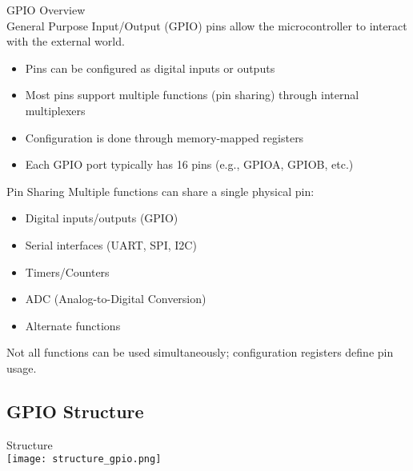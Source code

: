\begin{minipage}{0.55\linewidth}
\begin{concept}{GPIO Overview}\\
General Purpose Input/Output (GPIO) pins allow the microcontroller to interact with the external world.
\begin{itemize}
    \item Pins can be configured as digital inputs or outputs
    \item Most pins support multiple functions (pin sharing) through internal multiplexers
    \item Configuration is done through memory-mapped registers
    \item Each GPIO port typically has 16 pins (e.g., GPIOA, GPIOB, etc.)
\end{itemize}
\end{concept}
\end{minipage}
\begin{minipage}{0.45\linewidth}
\begin{theorem}{Pin Sharing}
Multiple functions can share a single physical pin:
\begin{itemize}
    \item Digital inputs/outputs (GPIO)
    \item Serial interfaces (UART, SPI, I2C)
    \item Timers/Counters
    \item ADC (Analog-to-Digital Conversion)
    \item Alternate functions
\end{itemize}
Not all functions can be used simultaneously; configuration registers define pin usage.
\end{theorem}
\end{minipage}



\subsection{GPIO Structure}



\begin{concept}{Structure}\\
    \texttt{[image: structure\_gpio.png]}
\end{concept}

